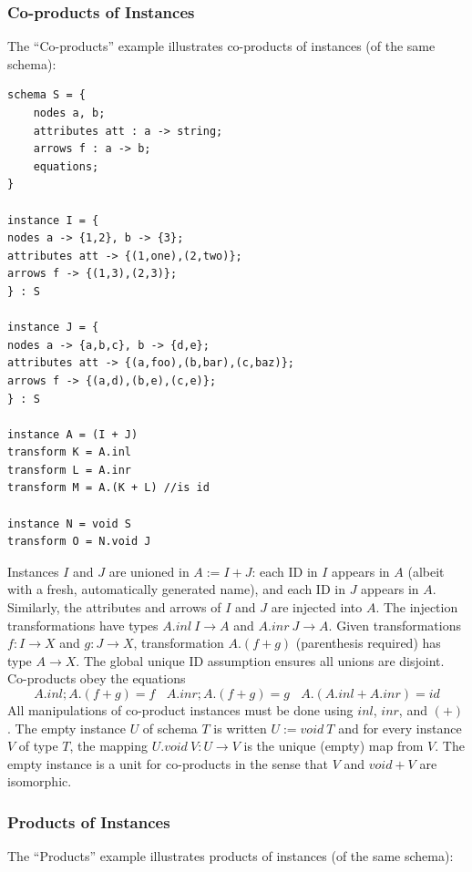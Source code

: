 \documentclass[12pt]{article}
\begin{document}
\subsubsection{Co-products of Instances}

The ``Co-products'' example illustrates co-products of instances (of the same schema):

\begin{verbatim}
schema S = {
	nodes a, b;
	attributes att : a -> string;
	arrows f : a -> b;
	equations;
}

instance I = {
nodes a -> {1,2}, b -> {3};
attributes att -> {(1,one),(2,two)};
arrows f -> {(1,3),(2,3)};
} : S

instance J = {
nodes a -> {a,b,c}, b -> {d,e};
attributes att -> {(a,foo),(b,bar),(c,baz)};
arrows f -> {(a,d),(b,e),(c,e)};
} : S

instance A = (I + J)
transform K = A.inl
transform L = A.inr
transform M = A.(K + L) //is id

instance N = void S
transform O = N.void J
\end{verbatim}
Instances $I$ and $J$ are unioned in $A := I + J$: each ID in $I$ appears in $A$ (albeit with a fresh, automatically generated name), and each ID in $J$ appears in $A$.  Similarly, the attributes and arrows of $I$ and $J$ are injected into $A$.  The injection transformations have types $A.inl \ I \to A$ and $A.inr \ J \to A$.  Given transformations $f : I \to X$ and $g : J \to X$, transformation $A.(f + g)$ (parenthesis required) has type $A \to X$.  The global unique ID assumption ensures all unions are disjoint. Co-products obey the equations
$$
A.inl ; A.(f + g) = f \ \ \ \ A.inr ; A.(f + g) = g \ \ \ \ A.(A.inl + A.inr) = id
$$
All manipulations of co-product instances must be done using $inl$, $inr$, and $(+)$.  The empty instance $U$ of schema $T$ is written $U := void \ T$ and for every instance $V$ of type $T$, the mapping $U.void \ V : U \to V$ is the unique (empty) map from $V$.  The empty instance is a unit for co-products in the sense that $V$ and $void + V$ are isomorphic.

\subsubsection{Products of Instances}

The ``Products'' example illustrates products of instances (of the same schema):
\end{document}
